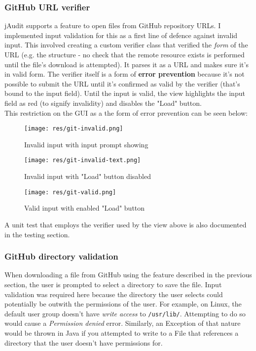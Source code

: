 \documentclass[9pt]{article}
\begin{document}
		\subsubsection{GitHub URL verifier}
			jAudit supports a feature to open files from GitHub repository
			URLs. I implemented input validation for this as a first line of
			defence against invalid input. This involved creating a custom
			verifier class that verified the \textit{form} of the URL (e.g. the
			structure - no check that the remote resource exists is performed
			until the file's download is attempted). It parses it as a URL and
			makes sure it's in valid form. The verifier itself is a form of
			\textbf{error prevention} because it's not possible to submit the
			URL until it's confirmed as valid by the verifier (that's bound to
			the input field). Until the input is valid, the view highlights the
			input field as red (to signify invalidity) and disables the "Load"
			button.\\

			This restriction on the GUI as a the form of error prevention can
			be seen below:\\

			\begin{figure}[H]
				\centering
				\texttt{[image: res/git-invalid.png]}
				\caption{Invalid input with input prompt showing}
			\end{figure}

			\begin{figure}[H]
				\centering
				\texttt{[image: res/git-invalid-text.png]}
				\caption{Invalid input with "Load" button disabled}
			\end{figure}

			\begin{figure}[H]
				\centering
				\texttt{[image: res/git-valid.png]}
				\caption{Valid input with enabled "Load" button}
			\end{figure}

			A unit test that employs the verifier used by the view above is also
			documented in the testing section.

		\subsubsection{GitHub directory validation}
			
			When downloading a file from GitHub using the feature described in
			the previous section, the user is prompted to select a directory to
			save the file. Input validation was required here because the
			directory the user selects could potentially be outwith the
			permissions of the user. For example, on Linux, the default user
			group doesn't have \textit{write access} to \texttt{/usr/lib/}.
			Attempting to do so would cause a \textit{Permission denied} error.
			Similarly, an Exception of that nature would be thrown in Java if
			you attempted to write to a File that references a directory that
			the user doesn't have permissions for.\\
\end{document}
